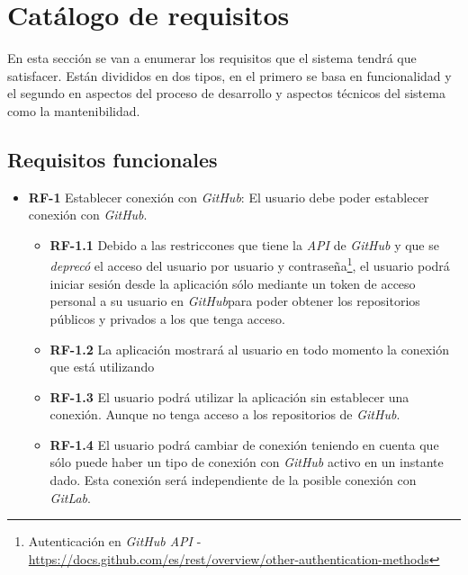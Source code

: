 \section{Catálogo de requisitos}
En esta sección se van a enumerar los requisitos que el sistema tendrá que satisfacer. Están divididos en dos tipos, en el primero se basa en funcionalidad y el segundo en aspectos del proceso de desarrollo y aspectos técnicos del sistema como la mantenibilidad.

\subsection{Requisitos funcionales}

\begin{itemize}
\item \textbf{RF-1} Establecer conexión con \textit{GitHub}: El usuario debe poder establecer conexión con \textit{GitHub}.
	\begin{itemize}
		\item \textbf{RF-1.1} Debido a las restriccones que tiene la \textit{API} de \textit{GitHub} y que se \textit{deprecó} el acceso del usuario por usuario y contraseña\footnote{Autenticación en \textit{GitHub API} - \url{https://docs.github.com/es/rest/overview/other-authentication-methods}}, el usuario podrá iniciar sesión desde la aplicación sólo mediante un token de acceso personal a su usuario en \textit{GitHub}para poder obtener los repositorios públicos y privados a los que tenga acceso.
		\item \textbf{RF-1.2} La aplicación mostrará al usuario en todo momento la conexión que está utilizando
		\item \textbf{RF-1.3} El usuario podrá utilizar la aplicación sin establecer una conexión. Aunque no tenga acceso a los repositorios de \textit{GitHub}.
		\item \textbf{RF-1.4} El usuario podrá cambiar de conexión teniendo en cuenta que sólo puede haber un tipo de conexión con \textit{GitHub} activo en un instante dado. Esta conexión será independiente de la posible conexión con \textit{GitLab}.


\end{itemize}
\end{itemize}
